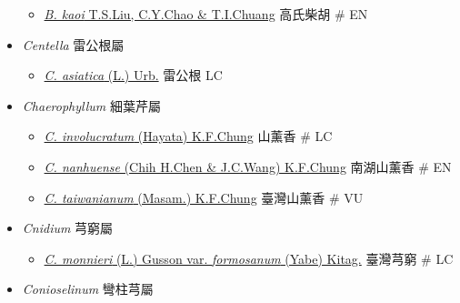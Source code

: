 \begin{itemize}
  \begin{itemize}
        \item[] \href{http://www.theplantlist.org/tpl1.1/search?q=Bupleurum+kaoi}{\textit{B. kaoi} T.S.Liu, C.Y.Chao \& T.I.Chuang}   高氏柴胡  \# EN
  \end{itemize}
 \item[] \textit{Centella} 雷公根屬
                                
  \begin{itemize}
        \item[] \href{http://www.theplantlist.org/tpl1.1/search?q=Centella+asiatica}{\textit{C. asiatica} (L.) Urb.}   雷公根   LC
  \end{itemize}
 \item[] \textit{Chaerophyllum} 細葉芹屬
                                
  \begin{itemize}
        \item[] \href{http://www.theplantlist.org/tpl1.1/search?q=Chaerophyllum+involucratum}{\textit{C. involucratum} (Hayata) K.F.Chung}   山薰香  \# LC
        \item[] \href{http://www.theplantlist.org/tpl1.1/search?q=Chaerophyllum+nanhuense}{\textit{C. nanhuense} (Chih H.Chen \& J.C.Wang) K.F.Chung}   南湖山薰香  \# EN
        \item[] \href{http://www.theplantlist.org/tpl1.1/search?q=Chaerophyllum+taiwanianum}{\textit{C. taiwanianum} (Masam.) K.F.Chung}   臺灣山薰香  \# VU
  \end{itemize}
 \item[] \textit{Cnidium} 芎窮屬
                                
  \begin{itemize}
        \item[] \href{http://www.theplantlist.org/tpl1.1/search?q=Cnidium+monnieri+var.+formosanum}{\textit{C. monnieri} (L.) Gusson var. \textit{formosanum} (Yabe) Kitag.}   臺灣芎窮  \# LC
  \end{itemize}
 \item[] \textit{Conioselinum} 彎柱芎屬
                                

\end{itemize}
